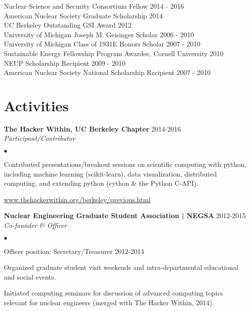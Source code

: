 \documentclass[margin,line]{res}
\newenvironment{list2}{
  \begin{list}{$\bullet$}{%
      \setlength{\itemsep}{0in}
      \setlength{\parsep}{0in} \setlength{\parskip}{0in}
      \setlength{\topsep}{0in} \setlength{\partopsep}{0in} 
      \setlength{\leftmargin}{0.2in}}}{\end{list}}
\begin{document}
\begin{resume}
Nuclear Science and Security Consortium Fellow \hfill 2014 - 2016 \\
American Nuclear Society Graduate Scholarship \hfill 2014 \\
UC Berkeley Outstanding GSI Award \hfill 2012 \\
University of Michigan Joseph M. Geisinger Scholar \hfill 2006 - 2010 \\
University of Michigan Class of 1931E Honors Scholar \hfill 2007 - 2010 \\
Sustainable Energy Fellowship Program Awardee, Cornell University \hfill 2010 \\
NEUP Scholarship Recipient \hfill 2009 - 2010 \\
American Nuclear Society National Scholarship Recipient \hfill 2007 - 2010 \\

\section{\sc Activities}

{\bf The Hacker Within, UC Berkeley Chapter} \hfill 2014-2016 \\ 
{\em Participant/Contributor} 

\begin{list2}
  \item Contributed presentations/breakout sessions on scientific computing
        with python, including machine learning (scikit-learn), data
        visualization, distributed computing, and extending python 
        (cython \& the Python C-API).
  \item \url{www.thehackerwithin.org/berkeley/previous.html}
\end{list2}

{\bf Nuclear Engineering Graduate Student Association | NEGSA} \hfill 2012-2015\\
{\em Co-founder \& Officer} 

\begin{list2}
  \item Officer position: Secretary/Treasurer \hfill 2012-2014
  \item Organized graduate student visit weekends and intra-departmental 
        educational and social events.
  \item Initiated computing seminars for discussion of advanced computing 
        topics relevant for nuclear engineers (merged with The Hacker Within,
        2014).
\end{list2}


\end{resume}
\end{document}
